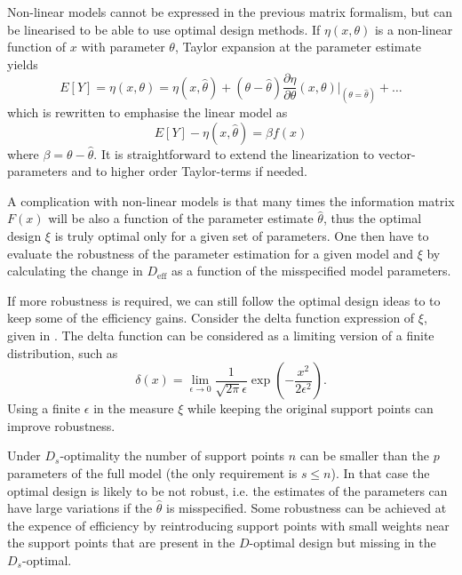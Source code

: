 \documentclass[12pt]{iopart}
\begin{document}
Non-linear models cannot be expressed in the previous matrix formalism, but can be linearised to be able to use optimal design methods. If $\eta(x, \theta)$ is a non-linear function of $x$ with parameter $\theta$, Taylor expansion at the parameter estimate yields
\begin{equation}
E[Y] = \eta(x, \theta) = \eta(x, \hat \theta) + (\theta - \hat \theta) \frac{\partial \eta}{\partial \theta}(x, \theta)|_{(\theta = \hat \theta)} + \ldots
\end{equation}
which is rewritten to emphasise the linear model as
\begin{equation}
E[Y] - \eta(x, \hat \theta) = \beta f(x)
\end{equation}
where $\beta = \theta - \hat \theta$. It is straightforward to extend the linearization to vector-parameters and to higher order Taylor-terms if needed.

A complication with non-linear models is that many times the information matrix $F(x)$ will be also a function of the parameter estimate $\hat \theta$, thus the optimal design $\xi$ is truly optimal only for a given set of parameters. One then have to evaluate the robustness of the parameter estimation for a given model and $\xi$ by calculating the change in $D_\mathrm{eff}$ as a function of the misspecified model parameters.

If more robustness is required, we can still follow the optimal design ideas to to keep some of the efficiency gains. Consider the delta function expression of $\xi$, given in . The delta function can be considered as a limiting version of a finite distribution, such as
\begin{equation}
\delta(x) = \lim_{\epsilon \rightarrow 0} \frac{1}{\sqrt{2 \pi} \epsilon } \exp\left(-\frac{x^2}{2 \epsilon^2}\right).
\label{eq:deltafinite}
\end{equation}
Using a finite $\epsilon$ in the measure $\xi$ while keeping the original support points can improve robustness. 

Under $D_s$-optimality the number of support points $n$ can be smaller than the $p$ parameters of the full model (the only requirement is $s \leq n$). In that case the optimal design is likely to be not robust, i.e. the estimates of the parameters can have large variations if the $\hat \theta$ is misspecified. Some robustness can be achieved at the expence of efficiency by reintroducing support points with small weights near the support points that are present in the $D$-optimal design but missing in the $D_s$-optimal.
\end{document}
